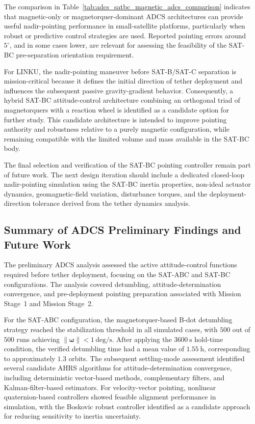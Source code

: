 The comparison in Table~\ref{tab:adcs_satbc_magnetic_adcs_comparison} indicates that magnetic-only or magnetorquer-dominant ADCS architectures can provide useful nadir-pointing performance in small-satellite platforms, particularly when robust or predictive control strategies are used. Reported pointing errors around \(5^\circ\), and in some cases lower, are relevant for assessing the feasibility of the SAT-BC pre-separation orientation requirement.

For LINKU, the nadir-pointing maneuver before SAT-B/SAT-C separation is mission-critical because it defines the initial direction of tether deployment and influences the subsequent passive gravity-gradient behavior. Consequently, a hybrid SAT-BC attitude-control architecture combining an orthogonal triad of magnetorquers with a reaction wheel is identified as a candidate option for further study. This candidate architecture is intended to improve pointing authority and robustness relative to a purely magnetic configuration, while remaining compatible with the limited volume and mass available in the SAT-BC body.

The final selection and verification of the SAT-BC pointing controller remain part of future work. The next design iteration should include a dedicated closed-loop nadir-pointing simulation using the SAT-BC inertia properties, non-ideal actuator dynamics, geomagnetic-field variation, disturbance torques, and the deployment-direction tolerance derived from the tether dynamics analysis.

\subsection{Summary of ADCS Preliminary Findings and Future Work}
\label{sub:adcs_summary_future_work}

The preliminary ADCS analysis assessed the active attitude-control functions required before tether deployment, focusing on the SAT-ABC and SAT-BC configurations. The analysis covered detumbling, attitude-determination convergence, and pre-deployment pointing preparation associated with Mission Stage~1 and Mission Stage~2.

For the SAT-ABC configuration, the magnetorquer-based B-dot detumbling strategy reached the stabilization threshold in all simulated cases, with \(500\) out of \(500\) runs achieving \(\|\boldsymbol{\omega}\| < 1~\mathrm{deg/s}\). After applying the \(3600~\mathrm{s}\) hold-time condition, the verified detumbling time had a mean value of \(1.55~\mathrm{h}\), corresponding to approximately \(1.3\) orbits. The subsequent settling-mode assessment identified several candidate AHRS algorithms for attitude-determination convergence, including deterministic vector-based methods, complementary filters, and Kalman-filter-based estimators. For velocity-vector pointing, nonlinear quaternion-based controllers showed feasible alignment performance in simulation, with the Boskovic robust controller identified as a candidate approach for reducing sensitivity to inertia uncertainty.

